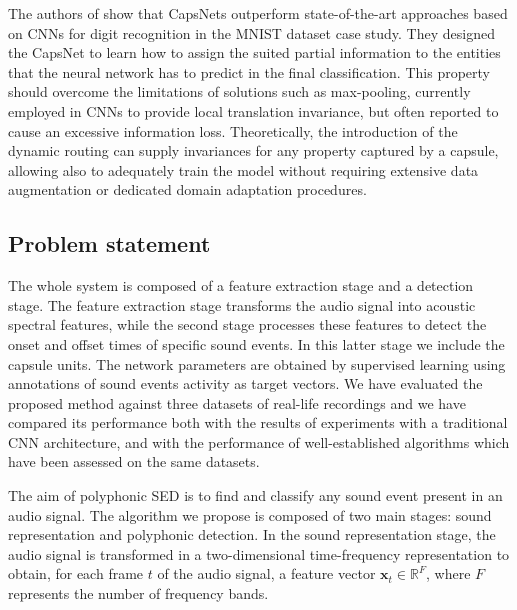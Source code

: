 The authors of \cite{sabour2017dynamic} show that CapsNets outperform state-of-the-art approaches based on CNNs for digit recognition in the MNIST dataset case study.
They designed the CapsNet to learn how to assign the suited partial information to the entities that the neural network has to predict in the final classification. This property should overcome the limitations of solutions such as max-pooling, currently employed in CNNs to provide local translation invariance, but often reported to cause an excessive information loss. Theoretically, the introduction of the dynamic routing can supply invariances for any property captured by a capsule, allowing also to adequately train the model without requiring extensive data augmentation or dedicated domain adaptation procedures.


\subsection{Problem statement}
The whole system is composed of a feature extraction stage and a detection stage. The feature extraction stage transforms the audio signal into acoustic spectral features, while the second stage processes these features to detect the onset and offset times of specific sound events.
In this latter stage we include the capsule units. The network parameters are obtained by supervised learning using annotations of sound events activity as target vectors. We have evaluated the proposed method against three datasets of real-life recordings and we have compared its performance both with the results of experiments with a traditional CNN architecture, and with the performance of well-established algorithms which have been assessed on the same datasets.

The aim of polyphonic SED is to find and classify any sound event present in an audio signal. The algorithm we propose is composed of two main stages: sound representation and polyphonic detection. In the sound representation stage, the audio signal is transformed in a two-dimensional time-frequency representation to obtain, for each frame $t$ of the audio signal, a feature vector $\mathbf{x}_t \in \mathbb{R}^F$, where $F$ represents the number of frequency bands. 

